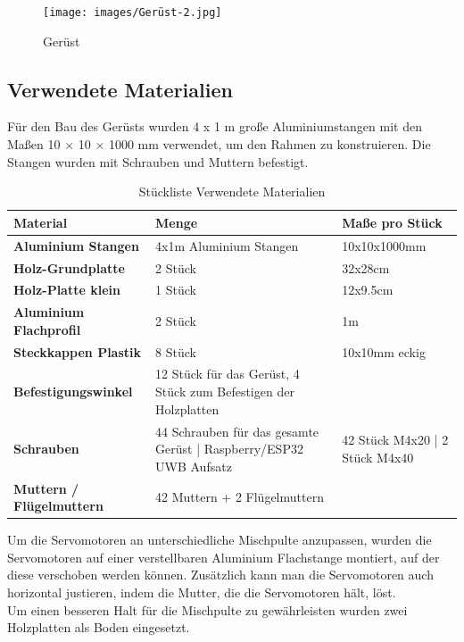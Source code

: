 \begin{figure}[H]
	\centering
	\texttt{[image: images/Gerüst-2.jpg]}
	\caption[Gerüst]{Gerüst}
	\label{fig:Gerüst-1}
\end{figure}



\subsection{Verwendete Materialien}
Für den Bau des Gerüsts wurden 4 x 1 m große Aluminiumstangen mit den Maßen 10 × 10 × 1000 mm verwendet, um den Rahmen zu konstruieren. Die Stangen wurden mit Schrauben und Muttern befestigt.\\

\begin{table} [H]
	\begin{tabular}{ |p{3.3cm} |p{4.8cm}|p{4.8cm}| }
		\hline
		\textbf{Material} & \textbf{Menge}& \textbf{Maße pro Stück}\\
		\hline
		\textbf{Aluminium Stangen} & 4x1m Aluminium Stangen & 10x10x1000mm  \\ 
		\hline
		\textbf{Holz-Grundplatte} & 2 Stück & 32x28cm   \\  
		\hline
		\textbf{Holz-Platte klein} & 1 Stück & 12x9.5cm   \\  
		\hline
		\textbf{Aluminium Flachprofil} & 2 Stück  & 1m \\
		\hline
		\textbf{Steckkappen Plastik} & 8 Stück & 10x10mm eckig  \\
		\hline
		\textbf{Befestigungswinkel}& 12 Stück für das Gerüst, 4 Stück zum Befestigen der Holzplatten   &  \\
		\hline
		\textbf{Schrauben}& 44 Schrauben für das gesamte Gerüst | 	Raspberry/ESP32 UWB Aufsatz & 42 Stück M4x20 | 2 Stück M4x40\\
		\hline
		\textbf{Muttern / Flügelmuttern}& 42 Muttern + 2 Flügelmuttern & \\
		\hline	
	\end{tabular}
	\caption{Stückliste Verwendete Materialien} 
\end{table} 




Um die Servomotoren an unterschiedliche Mischpulte anzupassen, wurden die Servomotoren auf einer verstellbaren Aluminium Flachstange montiert, auf der diese verschoben werden können. Zusätzlich kann man die Servomotoren auch horizontal justieren, indem die Mutter, die die Servomotoren hält, löst. \\
Um einen besseren Halt für die Mischpulte zu gewährleisten wurden zwei Holzplatten als Boden eingesetzt.

